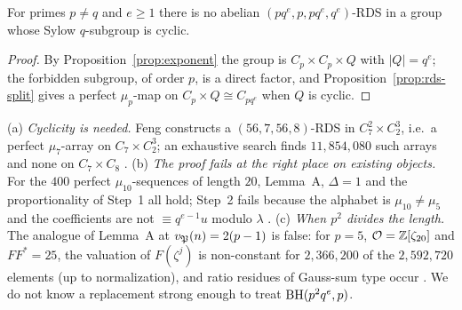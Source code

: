 \begin{corollary}\label{cor:C-rds}
For primes $p\ne q$ and $e\ge1$ there is no abelian
$(pq^e,p,pq^e,q^e)$-RDS in a group whose Sylow $q$-subgroup is cyclic.
\end{corollary}

\begin{proof}
By Proposition~\ref{prop:exponent} the group is $C_p\times C_p\times Q$
with $|Q|=q^e$; the forbidden subgroup, of order $p$, is a direct factor,
and Proposition~\ref{prop:rds-split} gives a perfect $\mu_p$-map on
$C_p\times Q\cong C_{pq^e}$ when $Q$ is cyclic.
\end{proof}

\begin{remark}\label{rem:C}
(a) \emph{Cyclicity is needed.} Feng \cite[Thm.~9]{Feng2009} constructs a
$(56,7,56,8)$-RDS in $C_7^2\times C_2^3$, i.e.\ a perfect $\mu_7$-array on
$C_7\times C_2^3$; an exhaustive search finds $11{,}854{,}080$ such arrays
and none on $C_7\times C_8$ .
(b) \emph{The proof fails at the right place on existing objects.} For
the $400$ perfect $\mu_{10}$-sequences of length $20$, Lemma~A,
$\Delta=1$ and the proportionality of Step~1 all hold; Step~2 fails
because the alphabet is $\mu_{10}\ne\mu_5$ and the coefficients are not
$\equiv q^{e-1}u$ modulo $\lambda$ .
(c) \emph{When $p^2$ divides the length.} The analogue of Lemma~A at
$v_{\mathfrak{P}}(n)=2(p-1)$ is false: for $p=5$, $\mathcal{O}=\mathbb{Z}[\zeta_{20}]$ and
$FF^*=25$, the valuation of $F(\zeta^j)$ is non-constant for
$2{,}366{,}200$ of the $2{,}592{,}720$ elements (up to normalization), and
ratio residues of Gauss-sum type occur . We do not know a
replacement strong enough to treat $\operatorname{BH}(p^2q^e,p)$.
\end{remark}

